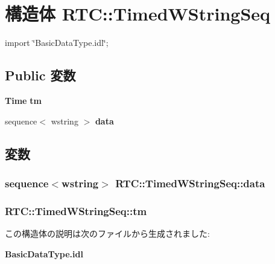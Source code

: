 \section{構造体 RTC::TimedWStringSeq}
\label{structRTC_1_1TimedWStringSeq}


{\ttfamily import \char`\"{}BasicDataType.idl\char`\"{};}

\subsection*{Public 変数}
\begin{DoxyCompactItemize}
\item 
{\bf Time} {\bf tm}
\item 
sequence$<$ wstring $>$ {\bf data}
\end{DoxyCompactItemize}


\subsection{変数}
\subsubsection[{data}]{\setlength{\rightskip}{0pt plus 5cm}sequence$<$wstring$>$ {\bf RTC::TimedWStringSeq::data}}\label{structRTC_1_1TimedWStringSeq_a01c8e9111a22f9656ba46638270282f2}
\subsubsection[{tm}]{ {\bf RTC::TimedWStringSeq::tm}}\label{structRTC_1_1TimedWStringSeq_a33d7df9ff47c8c5288729bebec480985}


この構造体の説明は次のファイルから生成されました:\begin{DoxyCompactItemize}
\item 
{\bf BasicDataType.idl}\end{DoxyCompactItemize}

